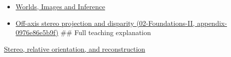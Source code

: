 \begin{itemize}
\item
  \href{Continuous\%20Notes/University\%20-\%20Worlds,\%20Images\%20and\%20Inference\%20-\%20Graphics,\%20Vision\%20and\%20Photography}{Worlds, Images and Inference}
\item
  \href{}{Off-axis stereo projection and disparity (02-Foundations-II, appendix-0976e86e5b9f)} \#\# Full teaching explanation
\end{itemize}

\href{Continuous\%20Notes/University\%20-\%20Worlds,\%20Images\%20and\%20Inference\%20-\%20Graphics,\%20Vision\%20and\%20Photography\#Stereo,\%20relative\%20orientation,\%20and\%20reconstruction}{Stereo, relative orientation, and reconstruction}
